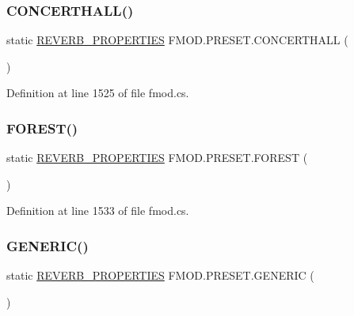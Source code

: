 \subsubsection{\texorpdfstring{C\+O\+N\+C\+E\+R\+T\+H\+A\+L\+L()}{CONCERTHALL()}}
{\footnotesize\ttfamily static \hyperlink{struct_f_m_o_d_1_1_r_e_v_e_r_b___p_r_o_p_e_r_t_i_e_s}{R\+E\+V\+E\+R\+B\+\_\+\+P\+R\+O\+P\+E\+R\+T\+I\+ES} F\+M\+O\+D.\+P\+R\+E\+S\+E\+T.\+C\+O\+N\+C\+E\+R\+T\+H\+A\+LL (\begin{DoxyParamCaption}{ }\end{DoxyParamCaption})\hspace{0.3cm}{\ttfamily [static]}}



Definition at line 1525 of file fmod.\+cs.

\mbox{\label{class_f_m_o_d_1_1_p_r_e_s_e_t_ae2e55de2f958ba39e853d5f00cf5adab}} 
\subsubsection{\texorpdfstring{F\+O\+R\+E\+S\+T()}{FOREST()}}
{\footnotesize\ttfamily static \hyperlink{struct_f_m_o_d_1_1_r_e_v_e_r_b___p_r_o_p_e_r_t_i_e_s}{R\+E\+V\+E\+R\+B\+\_\+\+P\+R\+O\+P\+E\+R\+T\+I\+ES} F\+M\+O\+D.\+P\+R\+E\+S\+E\+T.\+F\+O\+R\+E\+ST (\begin{DoxyParamCaption}{ }\end{DoxyParamCaption})\hspace{0.3cm}{\ttfamily [static]}}



Definition at line 1533 of file fmod.\+cs.

\mbox{\label{class_f_m_o_d_1_1_p_r_e_s_e_t_a278c39a93034cdf2092728b2af39a883}} 
\subsubsection{\texorpdfstring{G\+E\+N\+E\+R\+I\+C()}{GENERIC()}}
{\footnotesize\ttfamily static \hyperlink{struct_f_m_o_d_1_1_r_e_v_e_r_b___p_r_o_p_e_r_t_i_e_s}{R\+E\+V\+E\+R\+B\+\_\+\+P\+R\+O\+P\+E\+R\+T\+I\+ES} F\+M\+O\+D.\+P\+R\+E\+S\+E\+T.\+G\+E\+N\+E\+R\+IC (\begin{DoxyParamCaption}{ }\end{DoxyParamCaption})\hspace{0.3cm}{\ttfamily [static]}}



